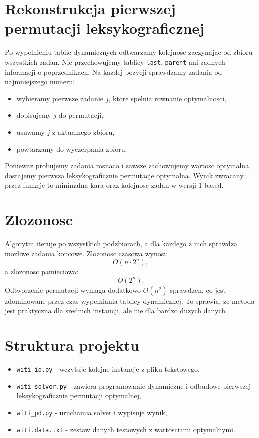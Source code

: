 \documentclass[a4paper,12pt]{article}
\begin{document}
\section{Rekonstrukcja pierwszej permutacji leksykograficznej}
Po wypelnieniu tablic dynamicznych odtwarzamy kolejnosc zaczynajac od zbioru wszystkich zadan.
Nie przechowujemy tablicy \texttt{last}, \texttt{parent} ani zadnych informacji o poprzednikach.
Na kazdej pozycji sprawdzamy zadania od najmniejszego numeru:
\begin{itemize}
  \item wybieramy pierwsze zadanie $j$, ktore spelnia rownanie optymalnosci,
  \item dopisujemy $j$ do permutacji,
  \item usuwamy $j$ z aktualnego zbioru,
  \item powtarzamy do wyczerpania zbioru.
\end{itemize}
Poniewaz probujemy zadania rosnaco i zawsze zachowujemy wartosc optymalna, dostajemy pierwsza leksykograficznie permutacje optymalna.
Wynik zwracany przez funkcje to minimalna kara oraz kolejnosc zadan w wersji 1-based.

\section{Zlozonosc}
Algorytm iteruje po wszystkich podzbiorach, a dla kazdego z nich sprawdza mozliwe zadania koncowe.
Zlozonosc czasowa wynosi:
\[
O(n \cdot 2^n),
\]
a zlozonosc pamieciowa:
\[
O(2^n).
\]
Odtworzenie permutacji wymaga dodatkowo $O(n^2)$ sprawdzen, co jest zdominowane przez czas wypelniania tablicy dynamicznej.
To sprawia, ze metoda jest praktyczna dla srednich instancji, ale nie dla bardzo duzych danych.

\section{Struktura projektu}
\begin{itemize}
  \item \texttt{witi\_io.py} - wczytuje kolejne instancje z pliku tekstowego,
  \item \texttt{witi\_solver.py} - zawiera programowanie dynamiczne i odbudowe pierwszej leksykograficznie permutacji optymalnej,
  \item \texttt{witi\_pd.py} - uruchamia solver i wypisuje wynik,
  \item \texttt{witi.data.txt} - zestaw danych testowych z wartosciami optymalnymi.
\end{itemize}
\end{document}
